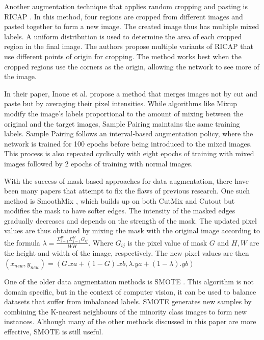 Another augmentation technique that applies random cropping and pasting is RICAP \cite{takahashiDataAugmentationUsing2020}. In this method, four regions are cropped from different images and pasted together to form a new image. The created image thus has multiple mixed labels. A uniform distribution is used to determine the area of each cropped region in the final image. The authors propose multiple variants of RICAP that use different points of origin for cropping. The method works best when the cropped regions use the corners as the origin, allowing the network to see more of the image.

In their paper, Inoue et al. propose a method that merges images not by cut and paste but by averaging their pixel intensities. While algorithms like Mixup \cite{zhangMixupEmpiricalRisk2018} modify the image's labels proportional to the amount of mixing between the original and the target images, Sample Pairing \cite{inoueDataAugmentationPairing2018} maintains the same training labels. Sample Pairing follows an interval-based augmentation policy, where the network is trained for 100 epochs before being introduced to the mixed images. This process is also repeated cyclically with eight epochs of training with mixed images followed by 2 epochs of training with normal images.

With the success of mask-based approaches for data augmentation, there have been many papers that attempt to fix the flaws of previous research. One such method is SmoothMix \cite{leeSmoothMixSimpleEffective2020}, which builds up on both CutMix \cite{yunCutMixRegularizationStrategy2019} and Cutout \cite{devriesImprovedRegularizationConvolutional2017} but modifies the mask to have softer edges. The intensity of the masked edges gradually decreases and depends on the strength of the mask. The updated pixel values are thus obtained by mixing the mask with the original image according to the formula $\lambda= \frac{\Sigma_{i=1}^{W}\Sigma_{j=1}^{H}G_{ij}}{WH}$. Where $G_{ij}$ is the pixel value of mask $G$ and $H,W$ are the height and width of the image, respectively. The new pixel values are then $(x_{new} , y_{new}) = (G.xa + (1 - G).xb , \lambda.ya + (1 - \lambda).yb)$

One of the older data augmentation methods is SMOTE \cite{SMOTESyntheticMinority}. This algorithm is not domain specific, but in the context of computer vision, it can be used to balance datasets that suffer from imbalanced labels. SMOTE generates new samples by combining the K-nearest neighbours of the minority class images to form new instances. Although many of the other methods discussed in this paper are more effective, SMOTE is still useful.

